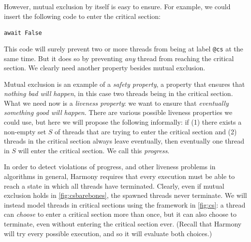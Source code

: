 \documentclass{report}
\newenvironment{code}{
\tcolorbox
}{
\endtcolorbox
}
\begin{document}
However, mutual exclusion by itself is easy to ensure.
For example, we could insert the following code to enter the
critical section:
\begin{code}
\texttt{await False}
\end{code}
This code will surely prevent two or more threads from being
at label \texttt{@cs} at the same time.
But it does so by preventing \emph{any} thread from reaching
the critical section.
We clearly need another property besides mutual exclusion.

Mutual exclusion is an example of a \emph{safety property},
%
a property that ensures that \emph{nothing bad will happen}, in this case
two threads being in the critical section.
What we need now is a \emph{liveness property}:
%
we want to ensure that
\emph{eventually something good will happen}.
There are various possible liveness properties we could use,
but here we will propose the following informally: if
(1) there exists a non-empty
set $S$ of threads that are trying to enter the critical section and
(2) threads in the critical section always leave eventually, then
eventually one thread in $S$ will enter the critical section.
We call this \emph{progress}.
%

In order to detect violations of progress, and other liveness problems in
algorithms in general, Harmony requires that every execution must be
able to reach a state in which all threads have terminated.
Clearly, even if mutual exclusion holds in \autoref{fig:csbarebones},
the spawned threads never terminate.  We
will instead model threads in critical sections using the framework in
\autoref{fig:cs}: a thread can \emph{choose} to enter a
critical section more than once, but it can also choose to terminate, even
without entering the critical section ever.
(Recall that Harmony will try every possible execution, and so it will evaluate
both choices.)

\end{document}
